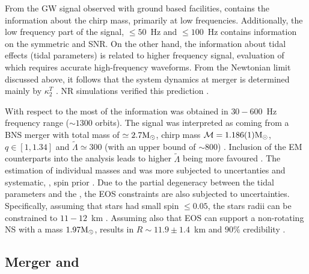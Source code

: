 From the \ac{GW} signal observed with ground based facilities, contains the information 
about the chirp mass, 
primarily at low frequencies. Additionally, the low frequency part of the signal, 
$\leq50$~Hz and $\leq100$~Hz contains information on the symmetric \mr{} and \ac{SNR}.
On the other hand, the information about tidal effects (tidal parameters) is related to 
higher frequency signal, evaluation of which requires accurate high-frequency waveforms.
%
From the Newtonian limit discussed above, it follows that the system dynamics at merger 
is determined mainly by $\kappa_2^T$ \cite{44}. \ac{NR} simulations verified this 
prediction \cite{60,55}. 

With respect to the \GW{} most of the information was obtained in $30-600$~Hz frequency 
range ($\sim 1300$ orbits).
The signal was interpreted as coming from a \ac{BNS} merger with total mass of $\simeq2.7{\text{M}_{\odot}}$,
chirp mass $\mathcal{M}=1.186(1){\text{M}_{\odot}}$, \mr{} $q\in[1,1.34]$ and $\tilde{\Lambda}\simeq 300$ 
(with an upper bound of $\sim800$) \cite{1,2,61}.
Inclusion of the \ac{EM} counterparts into the analysis leads to higher $\tilde{\Lambda}$ being 
more favoured \cite{62,63}.
%
The estimation of individual masses and \mr{} was more subjected to uncertanties and 
systematic, \ie, spin prior \cite{2}. Due to the partial degeneracy between the tidal 
parameters and the \mr{}, the \ac{EOS} constraints are also subjected to uncertainties. 
Specifically, assuming that stars had small spin $\leq 0.05$, the stars radii can be 
constrained to $11-12$~km \cite{64,65}. 
Assuming also that \ac{EOS} can support a non-rotating \ac{NS} with a mass $1.97{\text{M}_{\odot}}$, 
results in  $R\sim 11.9\pm 1.4$~km and $90\%$ credibility \cite{65}.
%
%



\subsection{Merger and \pmerg{}}